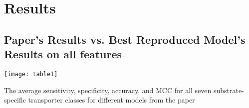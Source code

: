 \section {Results}
\subsection{Paper's Results vs. Best Reproduced Model's Results on all features}
    \begin{table}[h]
        \centering
        \texttt{[image: table1]}
        \captionsetup{font=footnotesize,width=10cm}
        \caption{The average sensitivity, specificity, accuracy, and MCC for all seven 
        substrate-specific transporter classes for different models from the paper}
        \label{tab:table1}
    \end{table}